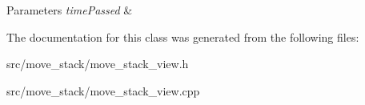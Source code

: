 \begin{DoxyParams}{Parameters}
{\em time\+Passed} & \\
\hline
\end{DoxyParams}


The documentation for this class was generated from the following files\+:\begin{DoxyCompactItemize}
\item 
src/move\+\_\+stack/move\+\_\+stack\+\_\+view.\+h\item 
src/move\+\_\+stack/move\+\_\+stack\+\_\+view.\+cpp\end{DoxyCompactItemize}
